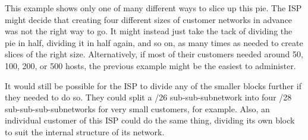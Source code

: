 This example shows only one of many different ways to slice up this pie.
The ISP might decide that creating four different sizes of customer
networks in advance was not the right way to go. It might instead just
take the tack of dividing the pie in half, dividing it in half again,
and so on, as many times as needed to create slices of the right size.
Alternatively, if most of their customers needed around 50, 100, 200, or
500 hosts, the previous example might be the easiest to administer.

It would still be possible for the ISP to divide any of the smaller
blocks further if they needed to do so. They could split a /26
sub-sub-subnetwork into four /28 sub-sub-sub-subnetworks for very small
customers, for example. Also, an individual customer of this ISP could
do the same thing, dividing its own block to suit the internal structure
of its network.
